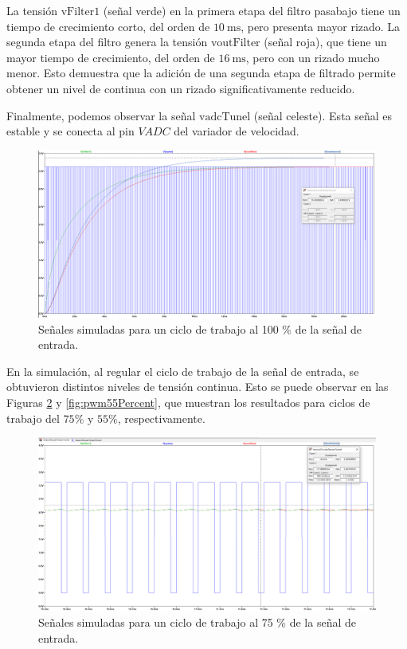 La tensión $\text{vFilter1}$ (señal verde) en la primera etapa del filtro pasabajo tiene un tiempo de crecimiento corto, del orden de $\SI{10}{\milli\second}$, pero presenta mayor rizado. La segunda etapa del filtro genera la tensión $\text{voutFilter}$ (señal roja), que tiene un mayor tiempo de crecimiento, del orden de $\SI{16}{\milli\second}$, pero con un rizado mucho menor. Esto demuestra que la adición de una segunda etapa de filtrado permite obtener un nivel de continua con un rizado significativamente reducido.

Finalmente, podemos observar la señal $\text{vadcTunel}$ (señal celeste). Esta señal es estable y se conecta al pin $VADC$ del variador de velocidad.


\begin{figure}[H]
    \centering
    \includegraphics[width=1\linewidth]{Figuras/datalogger/Hardware/pwm100Percent.png}
    \caption{Señales simuladas para un ciclo de trabajo al 100 \% de la señal de entrada.}
    \label{fig:pwm100Percent}
\end{figure}
En la simulación, al regular el ciclo de trabajo de la señal de entrada, se obtuvieron distintos niveles de tensión continua. Esto se puede observar en las Figuras \ref{fig:pwm75Percent} y \ref{fig:pwm55Percent}, que muestran los resultados para ciclos de trabajo del $75\%$ y $55\%$, respectivamente.

\begin{figure}[H]
    \centering
    \includegraphics[width=1.1\linewidth]{Figuras/datalogger/Hardware/pwm75Percent.png}
    \caption{Señales simuladas para un ciclo de trabajo al 75 \% de la señal de entrada.}
    \label{fig:pwm75Percent}
\end{figure}



